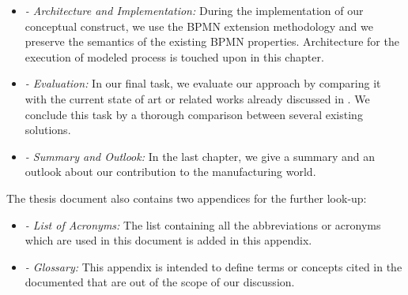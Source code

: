 \begin{itemize}
	\item \textit{ - Architecture and Implementation:} During the implementation of our conceptual construct, we use the \acs{BPMN} extension methodology and we preserve the semantics of the existing \acs{BPMN} properties. Architecture for the execution of modeled process is touched upon in this chapter.
	\item \textit{ - Evaluation:} 
	In our final task, we evaluate our approach by comparing it with the current state of art or related works already discussed in . We conclude this task by a thorough comparison between several existing solutions. 
	\item \textit{ - Summary and Outlook:} 
	In the last chapter, we give a summary and an outlook about our contribution to the manufacturing world.
\end{itemize}

The thesis document also contains two appendices for the further look-up:
\begin{itemize}
	\item \textit{ - List of Acronyms:} The list containing all the abbreviations or acronyms which are used in this document is added in this appendix.
	\item \textit{ - Glossary:} This appendix is intended to define terms or concepts cited in the documented that are out of the scope of our discussion.
\end{itemize}
